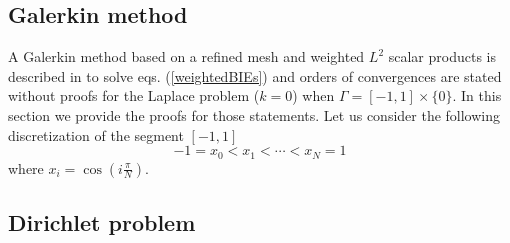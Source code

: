 \documentclass[a4paper]{article}
\begin{document}
\subsection{Galerkin method}

\label{subsec:GalerkineSetting}
A Galerkin method based on a refined mesh and weighted $L^2$ scalar products is described in \cite{alouges2018new} to solve eqs. (\ref{weightedBIEs}) and orders of convergences are stated without proofs for the Laplace problem ($k = 0$) when $\Gamma = [-1,1] \times\{0\}$. In this section we provide the proofs for those statements. 
Let us consider the following discretization of the segment $[-1,1]$
\[-1 = x_0 < x_1 < \cdots < x_N = 1\]
where $x_i = \cos(i \frac{\pi}{N})$.  

\subsection{Dirichlet problem}
\end{document}

